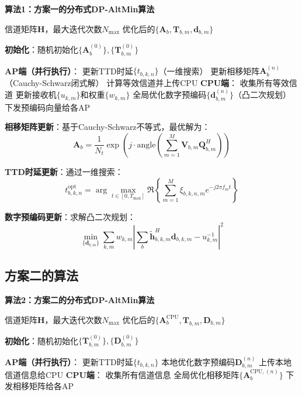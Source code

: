 \documentclass[10pt,twocolumn]{IEEEtran}
\newcommand{\vect}[1]{\mathbf{#1}}
\newcommand{\mat}[1]{\mathbf{#1}}
\begin{document}
\textbf{算法1：方案一的分布式DP-AltMin算法}

\begin{algorithmic}[1]
\REQUIRE 信道矩阵$\mat{H}$，最大迭代次数$N_{\max}$
\ENSURE 优化后的$\{\mat{A}_b, \mat{T}_{b,m}, \vect{d}_{b,m}\}$

\STATE \textbf{初始化}：随机初始化$\{\mat{A}_b^{(0)}\}, \{\mat{T}_{b,m}^{(0)}\}$

    \STATE \textbf{AP端（并行执行）}：
        \STATE 更新TTD时延$\{t_{b,k,n}\}$（一维搜索）
        \STATE 更新相移矩阵$\mat{A}_b^{(n)}$（Cauchy-Schwarz闭式解）
        \STATE 计算等效信道并上传CPU
    \ENDFOR
    \STATE \textbf{CPU端}：
    \STATE 收集所有等效信道
    \STATE 更新接收机$\{u_{k,m}\}$和权重$\{w_{k,m}\}$
    \STATE 全局优化数字预编码$\{\vect{d}_{b,m}^{(n)}\}$（凸二次规划）
    \STATE 下发预编码向量给各AP
\ENDFOR
\end{algorithmic}

\textbf{相移矩阵更新}：基于Cauchy-Schwarz不等式，最优解为：
\begin{equation}
\mat{A}_b = \frac{1}{N_t} \exp\left(j \cdot \text{angle}\left(\sum_{m=1}^M \mat{V}_{b,m} \mat{Q}_{b,m}^H\right)\right)
\end{equation}

\textbf{TTD时延更新}：通过一维搜索：
\begin{equation}
t_{b,k,n}^{\text{opt}} = \arg\max_{t \in [0, T_{\max}]} \Re\left\{\sum_{m=1}^M \xi_{b,k,n,m} e^{-j2\pi f_m t}\right\}
\end{equation}

\textbf{数字预编码更新}：求解凸二次规划：
\begin{equation}
\min_{\{\vect{d}_{b,m}\}} \sum_{k,m} w_{k,m} \left|\sum_b \tilde{\vect{h}}_{b,k,m}^H \vect{d}_{b,k,m} - u_{k,m}^{-1}\right|^2
\end{equation}

\subsection{方案二的算法}

\textbf{算法2：方案二的分布式DP-AltMin算法}

\begin{algorithmic}[1]
\REQUIRE 信道矩阵$\mat{H}$，最大迭代次数$N_{\max}$
\ENSURE 优化后的$\{\mat{A}_b^{\text{CPU}}, \mat{T}_{b,m}, \mat{D}_{b,m}\}$

\STATE \textbf{初始化}：随机初始化$\{\mat{T}_{b,m}^{(0)}\}, \{\mat{D}_{b,m}^{(0)}\}$

    \STATE \textbf{AP端（并行执行）}：
        \STATE 更新TTD时延$\{t_{b,k,n}\}$
        \STATE 本地优化数字预编码$\mat{D}_{b,m}^{(n)}$
        \STATE 上传本地信道信息给CPU
    \ENDFOR
    \STATE \textbf{CPU端}：
    \STATE 收集所有信道信息
    \STATE 全局优化相移矩阵$\{\mat{A}_b^{\text{CPU}, (n)}\}$
    \STATE 下发相移矩阵给各AP
\ENDFOR
\end{algorithmic}
\end{document}
